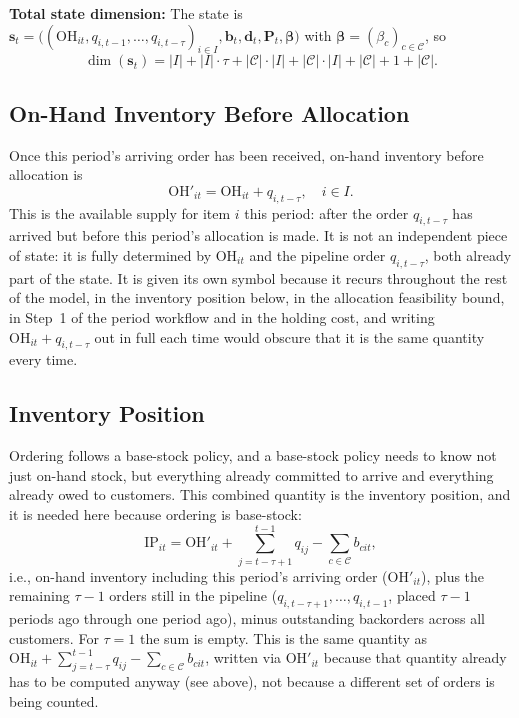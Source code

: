 \documentclass[11pt, a4paper]{article}
\theoremstyle{definition}
\theoremstyle{remark}
\newcommand{\IP}{\text{IP}}
\newcommand{\OH}{\text{OH}}
\begin{document}
\textbf{Total state dimension:} The state is $\mathbf{s}_t = \big((\OH_{it}, q_{i,t-1}, \ldots, q_{i,t-\tau})_{i \in I}, \mathbf{b}_t, \mathbf{d}_t, \mathbf{P}_t, \boldsymbol{\beta}\big)$ with $\boldsymbol{\beta} = (\beta_c)_{c \in \mathcal{C}}$, so
\begin{equation}
    \dim(\mathbf{s}_t) = |I| + |I| \cdot \tau + |\mathcal{C}|\cdot|I| + |\mathcal{C}|\cdot|I| + |\mathcal{C}| + 1 + |\mathcal{C}|.
\end{equation}

\subsection{On-Hand Inventory Before Allocation}

Once this period's arriving order has been received, on-hand inventory before allocation is
\begin{equation}
    \OH'_{it} = \OH_{it} + q_{i,t-\tau}, \quad i \in I.
\end{equation}
This is the available supply for item $i$ this period: after the order $q_{i,t-\tau}$ has arrived but before this period's allocation is made. It is not an independent piece of state: it is fully determined by $\OH_{it}$ and the pipeline order $q_{i,t-\tau}$, both already part of the state. It is given its own symbol because it recurs throughout the rest of the model, in the inventory position below, in the allocation feasibility bound, in Step~1 of the period workflow and in the holding cost, and writing $\OH_{it} + q_{i,t-\tau}$ out in full each time would obscure that it is the same quantity every time.

\subsection{Inventory Position}
\label{sec:ip}

Ordering follows a base-stock policy, and a base-stock policy needs to know not just on-hand stock, but everything already committed to arrive and everything already owed to customers. This combined quantity is the inventory position, and it is needed here because ordering is base-stock:
\begin{equation}
    \IP_{it} = \OH'_{it} + \sum_{j=t-\tau+1}^{t-1} q_{ij} - \sum_{c \in \mathcal{C}} b_{cit},
\end{equation}
i.e., on-hand inventory including this period's arriving order ($\OH'_{it}$), plus the remaining $\tau-1$ orders still in the pipeline ($q_{i,t-\tau+1}, \ldots, q_{i,t-1}$, placed $\tau-1$ periods ago through one period ago), minus outstanding backorders across all customers. For $\tau = 1$ the sum is empty. This is the same quantity as $\OH_{it} + \sum_{j=t-\tau}^{t-1} q_{ij} - \sum_{c \in \mathcal{C}} b_{cit}$, written via $\OH'_{it}$ because that quantity already has to be computed anyway (see above), not because a different set of orders is being counted.
\end{document}
